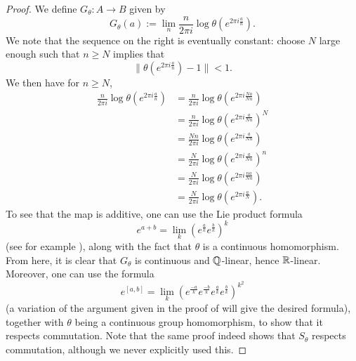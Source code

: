 \documentclass[12pt]{amsart}
\begin{document}
\begin{prop}
\begin{proof}

We define $G_\theta: A \to B$ given by
\begin{equation}
G_\theta(a) := \lim_n \frac{n}{2\pi i}\log \theta(e^{2\pi i \frac{a}{n}}).
\end{equation}
We note that the sequence on the right is eventually constant: choose $N$ large enough such that $n \geq N$ implies that 
\begin{equation}
\|\theta(e^{2\pi i \frac{a}{n}}) - 1\| < 1.
\end{equation}
We then have for $n \geq N$,
\begin{equation}
\begin{split}
\frac{n}{2\pi i}\log \theta(e^{2\pi i \frac{a}{n}}) &= \frac{n}{2\pi i}\log \theta(e^{2\pi i \frac{Na}{Nn}}) \\
&= \frac{n}{2\pi i}\log \theta(e^{2\pi i \frac{a}{Nn}})^N \\
&= \frac{Nn}{2\pi i}\log \theta(e^{2\pi i \frac{a}{Nn}}) \\
&= \frac{N}{2\pi i}\log \theta(e^{2\pi i \frac{a}{Nn}})^n \\
&= \frac{N}{2\pi i}\log \theta(e^{2\pi i \frac{na}{Nn}}) \\
&= \frac{N}{2\pi i}\log \theta(e^{2\pi i \frac{a}{N}}).
\end{split}
\end{equation}
To see that the map is additive, one can use the Lie product formula
\begin{equation}
e^{a+b} = \lim_k \left(e^{\frac{a}{k}}e^{\frac{b}{k}}\right)^k
\end{equation}
 (see for example \cite[Theorem 2.11]{HallBook}), along with the fact that $\theta$ is a continuous homomorphism. 
From here, it is clear that $G_\theta$ is continuous and $\mathbb{Q}$-linear, hence $\mathbb{R}$-linear. Moreover, one can use the formula 
\begin{equation}
e^{[a,b]} = \lim_k \left(e^{\frac{-a}{k}}e^{\frac{-b}{k}}e^{\frac{a}{k}}e^{\frac{b}{k}}\right)^{k^2}
\end{equation}
(a variation of the argument given in the proof of \cite[Theorem 2.11]{HallBook} will give the desired formula), together with $\theta$ being a continuous group homomorphism, to show that it respects commutation. Note that the same proof indeed shows that $S_\theta$ respects commutation, although we never explicitly used this.

\end{proof}
\end{prop}
\end{document}
